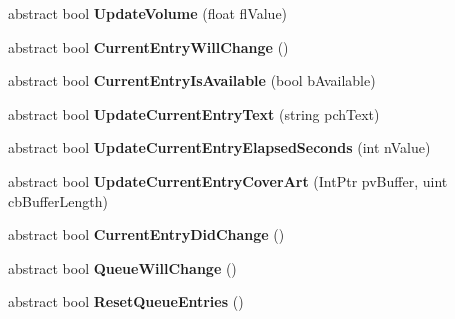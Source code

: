 \begin{DoxyCompactItemize}
abstract bool {\bfseries Update\+Volume} (float fl\+Value)
\item 
\mbox{\label{class_valve_1_1_steamworks_1_1_i_steam_music_remote_a032751b88699fb1858e6f5ec329f3bf7}} 
abstract bool {\bfseries Current\+Entry\+Will\+Change} ()
\item 
\mbox{\label{class_valve_1_1_steamworks_1_1_i_steam_music_remote_a9534f8d66d58b55458c2c1aff4a920a1}} 
abstract bool {\bfseries Current\+Entry\+Is\+Available} (bool b\+Available)
\item 
\mbox{\label{class_valve_1_1_steamworks_1_1_i_steam_music_remote_a5be44340078f52f570814c1fbae6d177}} 
abstract bool {\bfseries Update\+Current\+Entry\+Text} (string pch\+Text)
\item 
\mbox{\label{class_valve_1_1_steamworks_1_1_i_steam_music_remote_a39344f2441b2c6cfd9cd46dbc772cc07}} 
abstract bool {\bfseries Update\+Current\+Entry\+Elapsed\+Seconds} (int n\+Value)
\item 
\mbox{\label{class_valve_1_1_steamworks_1_1_i_steam_music_remote_a30a96a69e08a4ceece5b2aced86e1d4e}} 
abstract bool {\bfseries Update\+Current\+Entry\+Cover\+Art} (Int\+Ptr pv\+Buffer, uint cb\+Buffer\+Length)
\item 
\mbox{\label{class_valve_1_1_steamworks_1_1_i_steam_music_remote_ae58c38094bd491f4d983409b6ad631be}} 
abstract bool {\bfseries Current\+Entry\+Did\+Change} ()
\item 
\mbox{\label{class_valve_1_1_steamworks_1_1_i_steam_music_remote_a7aa6385be0698831a02c713582cc0808}} 
abstract bool {\bfseries Queue\+Will\+Change} ()
\item 
\mbox{\label{class_valve_1_1_steamworks_1_1_i_steam_music_remote_a7b5bb5f59967076d734f30caace4cb81}} 
abstract bool {\bfseries Reset\+Queue\+Entries} ()
\item 

\end{DoxyCompactItemize}
